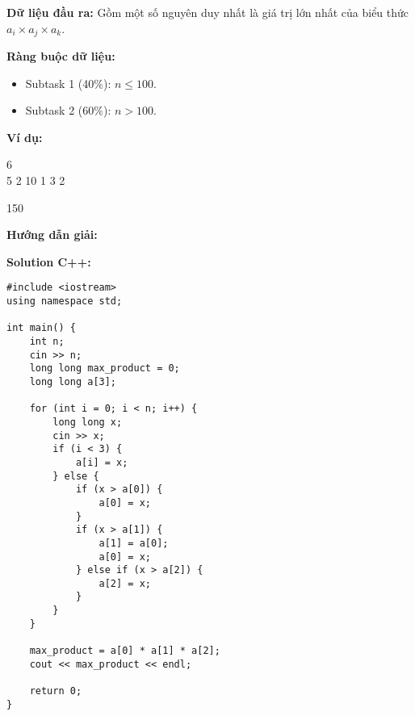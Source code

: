 \documentclass[12pt]{scrartcl}  %
\begin{document}
\textbf{Dữ liệu đầu ra:}
Gồm một số nguyên duy nhất là giá trị lớn nhất của biểu thức $a_i \times a_j \times a_k$.

\textbf{Ràng buộc dữ liệu:}
\begin{itemize}
    \item Subtask 1 (40\%): $n \leq 100$.
    \item Subtask 2 (60\%): $n > 100$.
\end{itemize}
\textbf{Ví dụ:}
\begin{tcolorbox}[colback=gray!5!white, colframe=blue!50!black, title=Input]
6\\
5 2 10 1 3 2
\end{tcolorbox}
\begin{tcolorbox}[colback=gray!5!white, colframe=green!50!black, title=Output]
150
\end{tcolorbox}
\textbf{Hướng dẫn giải:}

\textbf{Solution C++:}

\begin{lstlisting}
#include <iostream>
using namespace std;

int main() {
    int n;
    cin >> n;
    long long max_product = 0;
    long long a[3];
    
    for (int i = 0; i < n; i++) {
        long long x;
        cin >> x;
        if (i < 3) {
            a[i] = x;
        } else {
            if (x > a[0]) {
                a[0] = x;
            }
            if (x > a[1]) {
                a[1] = a[0];
                a[0] = x;
            } else if (x > a[2]) {
                a[2] = x;
            }
        }
    }
    
    max_product = a[0] * a[1] * a[2];
    cout << max_product << endl;
    
    return 0;
}
\end{lstlisting}
\end{document}
